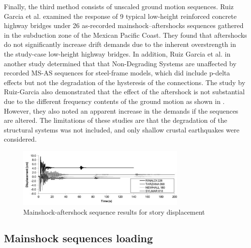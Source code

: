 Finally, the third method consists of unscaled ground motion sequences. Ruiz Garcia et al. \cite{Ruiz-Garcia2008} examined the response of 9 typical low-height reinforced concrete highway bridges under 26 as-recorded mainshock–aftershocks sequences gathered in the subduction zone of the Mexican Pacific Coast. They found that aftershocks do not significantly increase drift demands due to the inherent overstrength in the study-case low-height highway bridges\cite{Ruiz-Garcia2008}. In addition, Ruiz Garcia et al. \citep{Ruiz-Garcia2011} in another study determined that that Non-Degrading Systems are unaffected by recorded MS-AS sequences for steel-frame models, which did include p-delta effects but not the degradation of the hysteresis of the connections. The study by Ruiz-Garcia also demonstrated that the effect of the aftershock is not substantial due to the different frequency contents of the ground motion as shown in . However, they also noted an apparent increase in the demands if the sequences are altered. The limitations of these studies are that the degradation of the structural systems was not included, and only shallow crustal earthquakes were considered.

\begin{figure}[htbp]
\centering
\includegraphics[width=0.75\textwidth]{VAC Thesis 2.0/Chapter-2/figs/Ruiz_Garcia_Study.pdf}
\caption{Mainshock-aftershock sequence results for story displacement \cite{Ruiz-Garcia2011}}
\label{fig:MS-AS_Ruiz}
\end{figure}

\subsection{Mainshock sequences loading}

